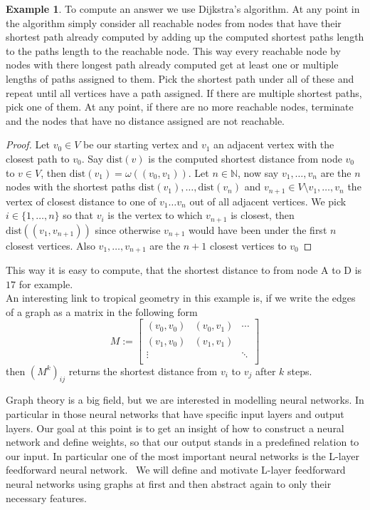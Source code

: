 \documentclass{article}
\theoremstyle{definition}
\newtheorem{example}[theorem]{Example}
\begin{document}
\begin{example}
To compute an answer we use Dijkstra's algorithm. At any point in the algorithm simply consider all reachable nodes from nodes that have their shortest path already computed by adding up the computed shortest paths length to the paths length to the reachable node. This way every reachable node by nodes with there longest path already computed get at least one or multiple lengths of paths assigned to them. Pick the shortest path under all of these and repeat until all vertices have a path assigned. If there are multiple shortest paths, pick one of them. At any point, if there are no more reachable nodes, terminate and the nodes that have no distance assigned are not reachable.
\begin{proof}
Let $v_0 \in V$ be our starting vertex and $v_1$ an adjacent vertex with the closest path to $v_0$. Say $\text{dist}(v)$ is the computed shortest distance from node $v_0$ to $v \in V$, then $\text{dist}(v_1) = \omega((v_0, v_1))$. Let $n \in \mathbb{N}$, now say $v_1, \dots , v_n$ are the $n$ nodes with the shortest paths $\text{dist}(v_1), \dots , \text{dist}(v_n)$ and $v_{n+1} \in V \setminus {v_1, \dots , v_n}$ the vertex of closest distance to one of $v_1 \dots v_n$ out of all adjacent vertices. We pick $i \in \{ 1 , \dots , n \}$ so that $v_i$ is the vertex to which $v_{n+1}$ is closest, then $\text{dist}((v_1, v_{n+1}))$ since otherwise $v_{n+1}$ would have been under the first $n$ closest vertices. Also $v_1 , \dots , v_{n+1}$ are the $n+1$  closest vertices to $v_0$
\end{proof}

This way it is easy to compute, that the shortest distance to from node A to D is $17$ for example. \\
An interesting link to tropical geometry in this example is, if we write the edges of a graph as a matrix in the following form
$$M := \left[ \begin{array}{rrrr}
(v_0, v_0) & (v_0, v_1) & \cdots \\
(v_1, v_0) & (v_1, v_1)  \\
\vdots &  & \ddots \\
\end{array}\right]$$
then $(M^{k})_{ij}$ returns the shortest distance from $v_i$ to $v_j$ after $k$ steps.
\end{example}

Graph theory is a big field, but we are interested in modelling neural networks. In particular in those neural networks that have specific input layers and output layers. Our goal at this point is to get an insight of how to construct a neural network and define weights, so that our output stands in a predefined relation to our input.
In particular one of the most important neural networks is the L-layer feedforward neural network. \
We will define and motivate L-layer feedforward neural networks using graphs at first and then abstract again to only their necessary features.
\end{document}
